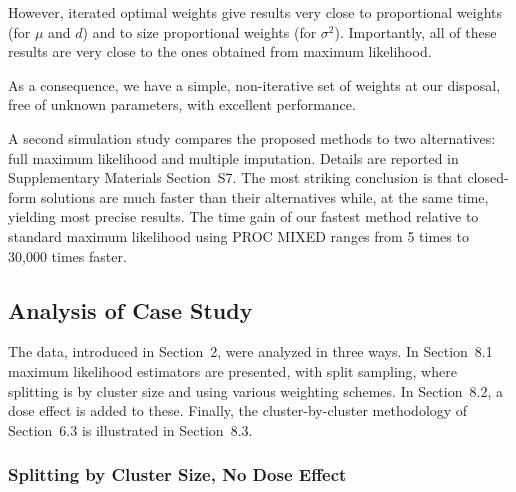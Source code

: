 \documentclass[11pt,a5paper,twoside]{book}
\begin{document}
However, iterated optimal weights give results very close to proportional 
weights (for $\mu$ and $d$) and to size proportional weights (for $\sigma^2$). 
Importantly, all of these results are very close to the ones 
obtained from maximum likelihood.

As a consequence, we have a simple, non-iterative set of weights at our 
disposal, free of unknown parameters, with excellent performance.

A second simulation study compares the proposed methods to two alternatives: full maximum likelihood and multiple imputation. Details are reported in Supplementary Materials Section~S7.
The most striking conclusion is that closed-form solutions are  much faster than their alternatives while, at the same time, yielding most precise results.
The time gain of our fastest method relative to standard maximum likelihood using PROC MIXED ranges from 5 times to 30,000 times faster.


\subsection{Analysis of Case Study}
\label{dataanal}

The data, introduced in Section~2,
were analyzed in three ways. 
In Section~8.1
maximum likelihood estimators are presented, with split sampling, where splitting is by cluster size and using various weighting schemes. In Section~8.2,
a dose effect is added to these. Finally, the cluster-by-cluster methodology of Section~6.3
is illustrated in Section~8.3.

\subsubsection{Splitting by Cluster Size, No Dose Effect}
\label{basic}
\end{document}
